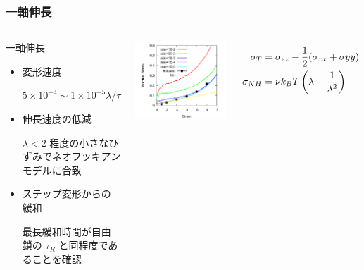 \documentclass[11pt, dvipdfmx]{beamer}
\begin{document}
\begin{frame}
\frametitle{一軸伸長}

\begin{columns}[totalwidth=1\textwidth]

\begin{block}{一軸伸長}
\begin{itemize}
\item
変形速度 

$5 \times 10^{-4} \sim 1 \times 10^{-5} \lambda/\tau$

\item
伸長速度の低減

$\lambda<2$ 程度の小さなひずみでネオフッキアンモデルに合致

\item
ステップ変形からの緩和

最長緩和時間が自由鎖の $\tau_R$ と同程度であることを確認
\end{itemize}

\end{block}

\includegraphics[width=\columnwidth]{./fig/N44_SS.pdf}

\vspace{-5mm}

\footnotesize
\begin{align*}
\sigma_{T} &= \sigma_{zz} -\dfrac{1}{2}(\sigma_{xx}+\sigma{yy}) \notag \\
\sigma_{NH} &= \nu k_B T \left(\lambda - \dfrac{1}{\lambda^2} \right)
\end{align*}

\end{columns}

\end{frame}
\end{document}

